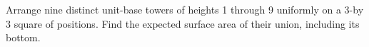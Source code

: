 Arrange nine distinct unit-base towers of heights 1 through 9 uniformly on a 3-by 3 square of positions. Find the expected surface area of their union, including its bottom.
